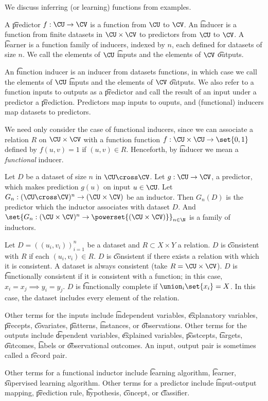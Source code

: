 
We discuss inferring (or learning) functions from examples.

A \t{predictor} $f: \CU \to \CV$ is a function from $\CU$ to $\CV$.
An \t{inducer} is a function from finite datasets in $\CU \times \CV$ to predictors from $\CU$ to $\CV$.
A \t{learner} is a function family of inducers, indexed by $n$, each defined for datasets of size $n$.
We call the elements of $\CU$ \t{inputs} and the elements of $\CV$ \t{outputs}.

An \t{function inducer} is an inducer from datasets functions, in which case we call the elements of $\CU$ \t{inputs} and the elements of $\CV$ \t{outputs}.
We also refer to a function inputs to outputs as a \t{predictor} and call the result of an input under a predictor a \t{prediction}.
Predictors map inputs to ouputs, and (functional) inducers map datasets to predictors.

We need only consider the case of functional inducers, since we can associate a relation $R$ on $\CU \times \CV$ with a function function $f: \CU \times \CU \to \set{0, 1}$ defined by $f(u, v) = 1$ if $(u, v) \in R$.
Henceforth, by \t{inducer} we mean a \textit{functional} inducer.


Let $D$ be a dataset of size $n$ in $\CU \cross \CV$.
Let $g: \CU \to \CV$, a predictor, which makes prediction $g(u)$ on input $u \in \CU$.
Let $G_n: (\CU \cross \CV)^n \to (\CU \times \CV)$ be an inductor.
Then $G_n(D)$ is the predictor which the inductor associates with dataset $D$.
And $\set{G_n: (\CU \times \CV)^n \to \powerset{(\CU \times \CV)}}_{n \in \N}$ is a family of inductors.


Let $D = ((u_i, v_i))_{i = 1}^{n}$ be a dataset and $R \subset X \times Y$ a relation.
$D$ is \t{consistent with $R$} if each $(u_i, v_i) \in R$.
$D$ is \t{consistent} if there exists a relation with which it is consistent.
A dataset is always consistent (take $R = \CU \times \CV$).
$D$ is \t{functionally consistent} if it is consistent with a function; in this case, $x_i = x_j \implies y_i = y_j$.
$D$ is \t{functionally complete} if $\union_i\set{x_i} = X$.
In this case, the dataset includes every element of the relation.


Other terms for the inputs include \t{independent variables}, \t{explanatory variables}, \t{precepts}, \t{covariates}, \t{patterns}, \t{instances}, or \t{observations}.
Other terms for the outputs include \t{dependent variables}, \t{explained variables}, \t{postcepts}, \t{targets}, \t{outcomes}, \t{labels} or \t{observational outcomes}.
An input, output pair is sometimes called a \t{record pair}.

Other terms for a functional inductor include \t{learning algorithm}, \t{learner}, \t{supervised learning algorithm}.
Other terms for a predictor include \t{input-output} mapping, \t{prediction rule}, \t{hypothesis}, \t{concept}, or \t{classifier}.
